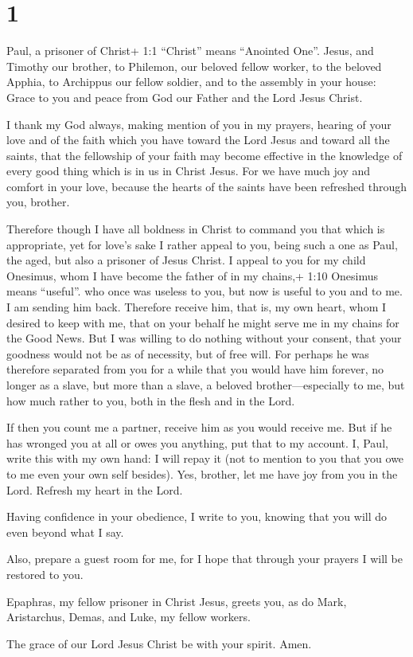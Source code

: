 \hypertarget{section}{%
\section{1}\label{section}}

 Paul, a prisoner of Christ+ 1:1 ``Christ'' means ``Anointed
One''. Jesus, and Timothy our brother, to Philemon, our beloved fellow
worker,  to the beloved Apphia, to Archippus our fellow
soldier, and to the assembly in your house:  Grace to you
and peace from God our Father and the Lord Jesus Christ.

 I thank my God always, making mention of you in my prayers,
 hearing of your love and of the faith which you have toward
the Lord Jesus and toward all the saints,  that the
fellowship of your faith may become effective in the knowledge of every
good thing which is in us in Christ Jesus.  For we have much
joy and comfort in your love, because the hearts of the saints have been
refreshed through you, brother.

 Therefore though I have all boldness in Christ to command
you that which is appropriate,  yet for love's sake I rather
appeal to you, being such a one as Paul, the aged, but also a prisoner
of Jesus Christ.  I appeal to you for my child Onesimus,
whom I have become the father of in my chains,+ 1:10 Onesimus means
``useful''.  who once was useless to you, but now is useful
to you and to me.  I am sending him back. Therefore receive
him, that is, my own heart,  whom I desired to keep with
me, that on your behalf he might serve me in my chains for the Good
News.  But I was willing to do nothing without your
consent, that your goodness would not be as of necessity, but of free
will.  For perhaps he was therefore separated from you for
a while that you would have him forever,  no longer as a
slave, but more than a slave, a beloved brother---especially to me, but
how much rather to you, both in the flesh and in the Lord.

 If then you count me a partner, receive him as you would
receive me.  But if he has wronged you at all or owes you
anything, put that to my account.  I, Paul, write this with
my own hand: I will repay it (not to mention to you that you owe to me
even your own self besides).  Yes, brother, let me have joy
from you in the Lord. Refresh my heart in the Lord.

 Having confidence in your obedience, I write to you,
knowing that you will do even beyond what I say.

 Also, prepare a guest room for me, for I hope that through
your prayers I will be restored to you.

 Epaphras, my fellow prisoner in Christ Jesus, greets you,
 as do Mark, Aristarchus, Demas, and Luke, my fellow
workers.

 The grace of our Lord Jesus Christ be with your spirit.
Amen.
